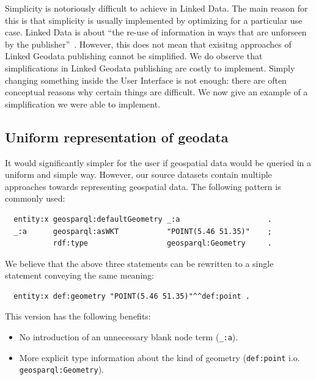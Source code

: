 \documentclass[a4paper]{scrartcl}
\newcommand{\textt}[1]{{\small \texttt{#1}}}
\begin{document}
Simplicity is notoriously difficult to achieve in Linked Data.  The
main reason for this is that simplicity is usually implemented by
optimizing for a particular use case.  Linked Data is about ``the
re-use of information in ways that are unforseen by the
publisher''~\cite{Bernerslee2006}.  However, this does not mean that
exisitng approaches of Linked Geodata publishing cannot be simplified.
We do observe that simplifications in Linked Geodata publishing are
costly to implement.  Simply changing something inside the User
Interface is not enough: there are often conceptual reasons why
certain things are difficult.  We now give an example of a
simplification we were able to implement.


\subsection{Uniform representation of geodata}

It would significantly simpler for the user if geospatial data would
be queried in a uniform and simple way.  However, our source datasets
contain multiple approaches towards representing geospatial data.  The
following pattern is commonly used:

\begin{verbatim}
  entity:x geosparql:defaultGeometry _:a                    .
  _:a      geosparql:asWKT           "POINT(5.46 51.35)"    ;
           rdf:type                  geosparql:Geometry     .
\end{verbatim}

We believe that the above three statements can be rewritten to a
single statement conveying the same meaning:

\begin{verbatim}
  entity:x def:geometry "POINT(5.46 51.35)"^^def:point .
\end{verbatim}

This version has the following benefits:

\begin{itemize}

\item No introduction of an unnecessary blank node term (\textt{\_:a}).

\item More explicit type information about the kind of geometry
  (\textt{def:point} i.o. \textt{geosparql:Geometry}).

\end{itemize}
\end{document}
